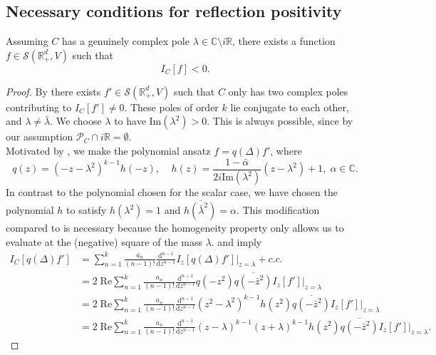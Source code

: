 \documentclass[10pt,a4paper,oneside,reqno]{amsart}
\newcommand{\reals}{\mathbb{R}}
\newcommand{\complexes}{\mathbb{C}}
\begin{document}
\subsection{Necessary conditions for reflection positivity}
\begin{prop}\label{Complex Poles Prop}
	Assuming $C$ has a genuinely complex pole $\lambda \in \complexes \setminus i\reals$, there exists a function $f\in \mathcal{S}(\mathbb{R}^d_+, V)$ such that 
    \begin{equation*}
    I_C[f] < 0.
    \end{equation*}
\end{prop}
\begin{proof}
By  there  exists $f'\in \mathcal{S}(\mathbb{R}^d_+, V)$ such that $C$ only has two complex poles contributing to $I_C[f']\neq 0$. These poles of order $k$ lie conjugate to each other, and $\lambda \neq \bar \lambda$. We choose $\lambda$ to have $\mathrm{Im}(\lambda^2) > 0$. This is always possible, since by our assumption $\mathcal P_C \cap i\reals = \emptyset$.\\
Motivated by \cite{Saueressig2018_RP}, we make the polynomial ansatz $f=q(\Delta) f'$, where
\begin{equation}
    q(z) = (-z-\lambda^2)^{k-1} h(-z),\;\;\;\; h(z) = \frac{1-\bar{\alpha}}{2i\mathrm{Im}(\lambda^2)}(z-\lambda^2)+1, \; \alpha \in \complexes.
\end{equation}
In contrast to the polynomial chosen for the scalar case, we have chosen the polynomial $h$ to satisfy $h(\lambda^2) =1$ and $\overline{h(\bar{\lambda}^2)}= \alpha$. This modification compared to \cite[Proposition III.5.]{Saueressig2018_RP} is necessary because the homogeneity property only allows us to evaluate at the (negative) square of the mass $\lambda$.  and  imply
\begin{align*}
I_C[q(\Delta)f'] &= \sum_{n=1}^{k}\frac{a_{n}}{(n-1)!} 	\frac{\mathrm{d}^{n-1}}{\mathrm{d} z^{n-1} } I_{z}[q(\Delta)f']\Bigr|_{z=\lambda} + c.c.\\
&= 2\; \mathrm{Re} \sum_{n=1}^{k}\frac{a_{n}}{(n-1)!} 	\frac{\mathrm{d}^{n-1}}{\mathrm{d} z^{n-1} }q(-z^2)\overline{q(-\bar{z}^2)} I_{z}[f']\Bigr|_{z=\lambda}\\
&= 2\; \mathrm{Re} \sum_{n=1}^{k}\frac{a_{n}}{(n-1)!} 	\frac{\mathrm{d}^{n-1}}{\mathrm{d} z^{n-1} }(z^2-\lambda^2)^{k-1}h(z^2)\overline{q(-\bar{z}^2)} I_{z}[f']\Bigr|_{z=\lambda}\\
&= 2\; \mathrm{Re} \sum_{n=1}^{k}\frac{a_{n}}{(n-1)!} 	\frac{\mathrm{d}^{n-1}}{\mathrm{d} z^{n-1} }(z-\lambda)^{k-1}(z+\lambda)^{k-1}h(z^2)\overline{q(-\bar{z}^2)} I_{z}[f']\Bigr|_{z=\lambda}.

\end{align*}
\end{proof}
\end{document}
